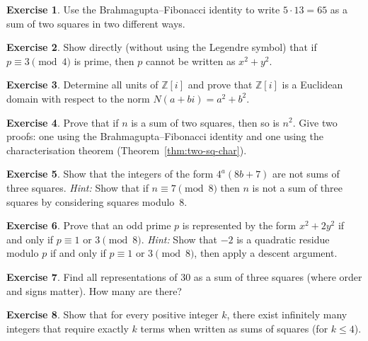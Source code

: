 \documentclass[12pt,a4paper,openany]{book}
\theoremstyle{definition}
\newtheorem{exercise}{Exercise}[chapter]
\theoremstyle{plain}
\theoremstyle{remark}
\newcommand{\Z}{\mathbb{Z}}
\begin{document}
\begin{exercise}\label{exer:two-sq-product}
Use the Brahmagupta--Fibonacci identity to write $5 \cdot 13 = 65$ as a
sum of two squares in two different ways.
\end{exercise}

\begin{exercise}\label{exer:p-mod-4-necessity}
Show directly (without using the Legendre symbol) that if $p \equiv 3 \pmod{4}$
is prime, then $p$ cannot be written as $x^2 + y^2$.
\end{exercise}

\begin{exercise}\label{exer:gaussian-units}
Determine all units of $\Z[i]$ and prove that $\Z[i]$ is a Euclidean domain
with respect to the norm $N(a+bi) = a^2+b^2$.
\end{exercise}

\begin{exercise}\label{exer:sum-2-sq-n}
Prove that if $n$ is a sum of two squares, then so is $n^2$.  Give two proofs:
one using the Brahmagupta--Fibonacci identity and one using the characterisation
theorem (Theorem~\ref{thm:two-sq-char}).
\end{exercise}

\begin{exercise}\label{exer:four-sq-7}
Show that the integers of the form $4^a(8b+7)$ are not sums of three squares.
\textit{Hint:} Show that if $n \equiv 7 \pmod{8}$ then $n$ is not a sum of
three squares by considering squares modulo~$8$.
\end{exercise}

\begin{exercise}\label{exer:x2+2y2}
Prove that an odd prime $p$ is represented by the form $x^2 + 2y^2$ if and
only if $p \equiv 1$ or $3 \pmod{8}$.
\textit{Hint:} Show that $-2$ is a quadratic residue modulo $p$ if and only if
$p \equiv 1$ or $3\pmod{8}$, then apply a descent argument.
\end{exercise}

\begin{exercise}\label{exer:three-sq-count}
Find all representations of $30$ as a sum of three squares
(where order and signs matter).  How many are there?
\end{exercise}

\begin{exercise}\label{exer:large-form}
Show that for every positive integer $k$, there exist infinitely many integers
that require exactly $k$ terms when written as sums of squares (for $k \le 4$).
\end{exercise}
\end{document}
